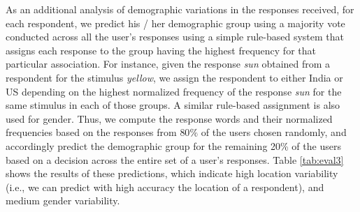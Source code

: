 \documentclass[11pt,letterpaper]{article}
\begin{document}
As an additional analysis of demographic variations in the responses received, for each respondent, we predict his / her demographic group using a majority vote conducted across all the user's responses using a simple rule-based system that assigns each response to the group having the highest frequency for that particular association. For instance, given the response {\it sun} obtained from a respondent for the stimulus {\it yellow}, we assign the respondent to either India or US depending on the highest normalized frequency of the response {\it sun} for the same stimulus in each of those groups. 
A similar rule-based assignment is also used for gender. Thus, we compute the response words and their normalized frequencies based on the responses from $80\%$ of the users chosen randomly, and accordingly predict the demographic group for the remaining 20\% of the users based on a decision across the entire set of a user's responses. 
 Table \ref{tab:eval3} shows the results of these predictions, which indicate high location variability (i.e., we can predict with high accuracy the location of a respondent), and medium gender variability. 




\begin{table}[ht]
\centering
{}
\caption{Intra-group similarities (the higher the similarity, the more cohesive the group is).}
\label{tab:intra-groupSimilarity}
\end{table}
\end{document}
